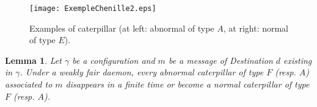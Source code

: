 \documentclass[11pt]{article}
\newtheorem{lemma}{Lemma}
\begin{document}
\begin{figure}
\begin{centering}
\texttt{[image: ExempleChenille2.eps]}
\par\end{centering}
\caption{\label{fig:CaterpillarD}Examples of caterpillar (at left: abnormal of type $A$, at right: normal of type $E$).}
\end{figure}

\begin{lemma} \label{lem:prelem1}
Let $\gamma$ be a configuration and $m$ be a message of Destination $d$ existing in $\gamma$. Under a weakly fair daemon, every abnormal caterpillar of type $F$ (resp. $A$) associated to $m$ disappears in a finite time or become a normal caterpillar of type $F$ (resp. $A$).
\end{lemma}
\end{document}
